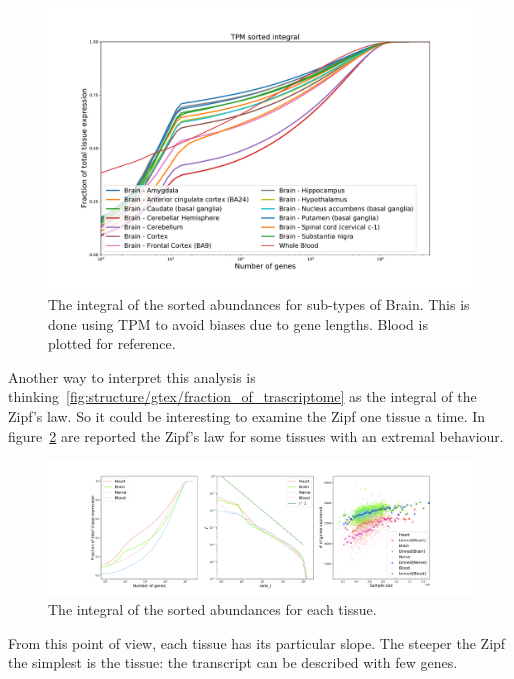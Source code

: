 \begin{figure}[htb!]
  \centering
  \includegraphics[width=0.65\linewidth]{pictures/structure/gtex/fraction_of_trascriptome_Brain.pdf}
  \caption{The integral of the sorted abundances for sub-types of Brain. This is done using TPM to avoid biases due to gene lengths. Blood is plotted for reference.}
  \label{fig:structure/gtex/fraction_of_trascriptome_Brain}
\end{figure}

Another way to interpret this analysis is thinking~\ref{fig:structure/gtex/fraction_of_trascriptome} as the integral of the Zipf's law. So it could be interesting to examine the Zipf one tissue a time. In figure~\ref{fig:structure/gtex/zipf_tissue} are reported the Zipf's law for some tissues with an extremal behaviour.
\begin{figure}[htb!]
  \centering
  \includegraphics[width=0.45\linewidth]{pictures/structure/gtex/zipf_tissue.pdf}
  \caption{The integral of the sorted abundances for each tissue.}
  \label{fig:structure/gtex/zipf_tissue}
\end{figure}
From this point of view, each tissue has its particular slope. The steeper the Zipf the simplest is the tissue: the transcript can be described with few genes.

